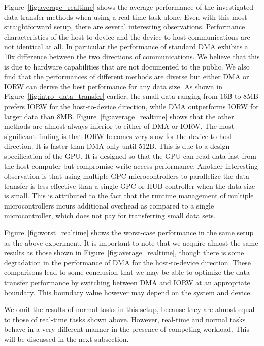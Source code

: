 Figure~\ref{fig:average_realtime} shows the average performance of the
investigated data transfer methods when using a real-time task alone.
Even with this most straightforward setup, there are several interesting
observations.
Performance characteristics of the host-to-device and the device-to-host
communications are not identical at all.
In particular the performance of standard DMA exhibits a 10x difference
between the two directions of communications.
We believe that this is due to hardware capabilities that are not
documented to the public.
We also find that the performances of different methods are diverse but
either \textsf{DMA} or \textsf{IORW} can derive the best performance for
any data size.
As shown in Figure~\ref{fig:intro_data_transfer} earlier, the small data
ranging from $16$B to $8$MB prefers \textsf{IORW} for the host-to-device
direction, while \textsf{DMA} outperforms \textsf{IORW} for larger data
than $8$MB.
Figure~\ref{fig:average_realtime} shows that the other methods are
almost always inferior to either of \textsf{DMA} or \textsf{IORW}.
The most significant finding is that \textsf{IORW} becomes very slow for
the device-to-host direction.
It is faster than \textsf{DMA} only until $512$B.
This is due to a design specification of the GPU.
It is designed so that the GPU can read data fast from the host computer
but compromise write access performance.
Another interesting observation is that using multiple GPC
microcontrollers to parallelize the data transfer is less effective than
a single GPC or HUB controller when the data size is small.
This is attributed to the fact that the runtime management of multiple
microcontrollers incurs additional overhead as compared to a single
microcontroller, which does not pay for transferring small data sets.

Figure~\ref{fig:worst_realtime} shows the worst-case performance in
the same setup as the above experiment.
It is important to note that we acquire almost the same results as those
shown in Figure~\ref{fig:average_realtime}, though there is
some degradation in the performance of \textsf{DMA} for the
host-to-device direction.
These comparisons lead to some conclusion that we may be able to
optimize the data transfer performance by switching between \textsf{DMA}
and \textsf{IORW} at an appropriate boundary.
This boundary value however may depend on the system and device.

We omit the results of normal tasks in this setup, because they are
almost equal to those of real-time tasks shown above.
However, real-time and normal tasks behave in a very different manner in
the presence of competing workload.
This will be discussed in the next subsection.

